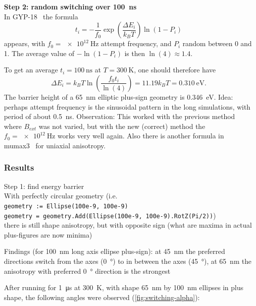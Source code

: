 \documentclass[10pt,a4paper]{article}
\newcommand{\code}[1]{\texttt{#1}}
\begin{document}
\textbf{Step 2: random switching over \SI{100}{\nano\second}} \\
In GYP-18~\cite{GYP-18} the formula
\begin{equation}
    t_i = -\frac{1}{f_0} \exp(\frac{\Delta E_i}{k_B T}) \ln(1-P_i)
    \label{eq:Switching_time}
\end{equation}
appears, with $f_0 = \SI{e12}{\hertz}$ attempt frequency, and $P_i$ random between 0 and 1. The average value of $-\ln(1-P_i)$ is then $\ln(4) \approx 1.4$.

To get an average $t_i = \SI{100}{\nano\second}$ at $T=\SI{300}{\kelvin}$, one should therefore have
\begin{equation}
    \Delta E_i = k_B T \ln(\frac{f_0 t_i}{\ln(4)}) = 11.19 k_B T = \SI{0.310}{\electronvolt} \mathrm{.}
\end{equation}
The barrier height of a \SI{65}{\nano\metre} elliptic plus-sign geometry is \SI{0.346}{\electronvolt}.
Idea: perhaps attempt frequency is the sinusoidal pattern in the long simulations, with period of about \SI{0.5}{\nano\second}. Observation: This worked with the previous method where $B_{ext}$ was not varied, but with the new (correct) method the $f_0 = \SI{e12}{\hertz}$ works very well again.
Also there is another formula in mumax3~\cite{MuMax3} for uniaxial anisotropy.

\subsubsection{Results}
Step 1: find energy barrier \\
With perfectly circular geometry (i.e. \\
\code{geometry := Ellipse(100e-9, 100e-9)} \\
\code{geometry = geometry.Add(Ellipse(100e-9, 100e-9).RotZ(Pi/2))}) \\
there is still shape anisotropy, but with opposite sign (what are maxima in actual plus-figures are now minima)

Findings (for \SI{100}{\nano\metre} long axis ellipse plus-sign):
at \SI{45}{\nano\metre} the preferred directions switch from the axes (\SI{0}{\degree}) to in between the axes (\SI{45}{\degree}),
at \SI{65}{\nano\metre} the anisotropy with preferred \SI{0}{\degree} direction is the strongest

After running for \SI{1}{\micro\second} at \SI{300}{\kelvin}, with shape \SI{65}{\nano\metre} by \SI{100}{\nano\metre} ellipses in plus shape, the following angles were observed (\cref{fig:switching-alpha}):
\end{document}

